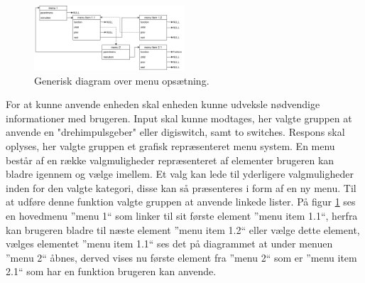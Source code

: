 \begin{figure}
	\centering 
	\includegraphics[width=0.5\textwidth]{billeder/menuesdiagram.png} 
	\caption{Generisk diagram over menu opsætning. } 
	\label{fig:menuesdiagram} 
\end{figure}
For at kunne anvende enheden skal enheden kunne udveksle nødvendige informationer med brugeren. 
Input skal kunne modtages, her valgte gruppen at anvende en "drehimpulsgeber" eller digiswitch, samt to switches.
Respons skal oplyses, her valgte gruppen et grafisk repræsenteret menu system.
En menu består af en række valgmuligheder repræsenteret af elementer brugeren kan bladre igennem og vælge imellem.
Et valg kan lede til yderligere valgmuligheder inden for den valgte kategori, disse kan så præsenteres i form af en ny menu.
Til at udføre denne funktion valgte gruppen at anvende linkede lister.\newline
På figur \ref{fig:menuesdiagram} ses en hovedmenu ''menu 1`` som linker til sit første element ''menu item 1.1``, herfra kan brugeren bladre til næste element ''menu item 1.2`` eller vælge dette element, vælges elementet ''menu item 1.1`` ses det på diagrammet at under menuen ''menu 2`` åbnes, derved vises nu første element fra ''menu 2`` som er ''menu item 2.1`` som har en funktion brugeren kan anvende.
